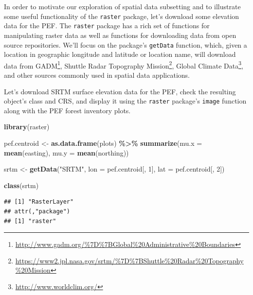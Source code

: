 \documentclass[
]{krantz}
\newenvironment{Shaded}{\begin{snugshade}}{\end{snugshade}}
\newcommand{\DataTypeTok}[1]{\textcolor[rgb]{0.13,0.29,0.53}{#1}}
\newcommand{\DecValTok}[1]{\textcolor[rgb]{0.00,0.00,0.81}{#1}}
\newcommand{\KeywordTok}[1]{\textcolor[rgb]{0.13,0.29,0.53}{\textbf{#1}}}
\newcommand{\NormalTok}[1]{#1}
\newcommand{\OperatorTok}[1]{\textcolor[rgb]{0.81,0.36,0.00}{\textbf{#1}}}
\newcommand{\StringTok}[1]{\textcolor[rgb]{0.31,0.60,0.02}{#1}}
\renewcommand{\href}[2]{#2\footnote{\url{#1}}}
\begin{document}
In order to motivate our exploration of spatial data subsetting and to illustrate some useful functionality of the \texttt{raster} package, let's download some elevation data for the PEF. The \texttt{raster} package has a rich set of functions for manipulating raster data as well as functions for downloading data from open source repositories. We'll focus on the package's \texttt{getData} function, which, given a location in geographic longitude and latitude or location name, will download data from \href{http://www.gadm.org/\%7D\%7BGlobal\%20Administrative\%20Boundaries}{GADM}, \href{https://www2.jpl.nasa.gov/srtm/\%7D\%7BShuttle\%20Radar\%20Topography\%20Mission}{Shuttle Radar Topography Mission}, \href{http://www.worldclim.org/}{Global Climate Data}, and other sources commonly used in spatial data applications.

Let's download SRTM surface elevation data for the PEF, check the resulting object's class and CRS, and display it using the \texttt{raster} package's \texttt{image} function along with the PEF forest inventory plots.

\begin{Shaded}
\begin{Highlighting}[]
\KeywordTok{library}\NormalTok{(raster)}

\NormalTok{pef.centroid \textless{}{-}}\StringTok{ }\KeywordTok{as.data.frame}\NormalTok{(plots) }\OperatorTok{\%\textgreater{}\%}\StringTok{ }
\StringTok{    }\KeywordTok{summarize}\NormalTok{(}\DataTypeTok{mu.x =} \KeywordTok{mean}\NormalTok{(easting), }\DataTypeTok{mu.y =} \KeywordTok{mean}\NormalTok{(northing))}

\NormalTok{srtm \textless{}{-}}\StringTok{ }\KeywordTok{getData}\NormalTok{(}\StringTok{"SRTM"}\NormalTok{, }\DataTypeTok{lon =}\NormalTok{ pef.centroid[, }\DecValTok{1}\NormalTok{], }\DataTypeTok{lat =}\NormalTok{ pef.centroid[, }\DecValTok{2}\NormalTok{])}
\end{Highlighting}
\end{Shaded}

\begin{Shaded}
\begin{Highlighting}[]
\KeywordTok{class}\NormalTok{(srtm)}
\end{Highlighting}
\end{Shaded}

\begin{verbatim}
## [1] "RasterLayer"
## attr(,"package")
## [1] "raster"
\end{verbatim}
\end{document}
